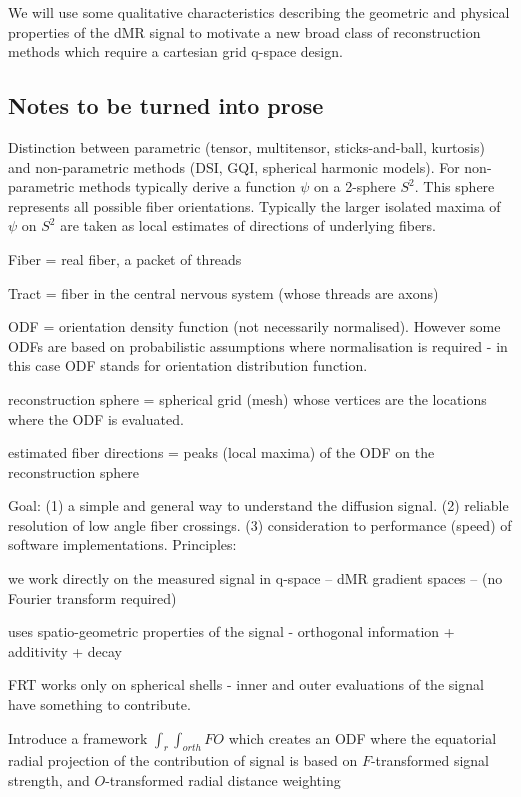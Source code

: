 \documentclass{bioinfo}
\begin{document}
We will use some qualitative characteristics describing the geometric
and physical properties of the dMR signal to motivate a new broad class
of reconstruction methods which require a cartesian grid q-space design.

\subsection{Notes to be turned into prose}

Distinction between parametric (tensor, multitensor, sticks-and-ball,
kurtosis) and non-parametric methods (DSI, GQI, spherical harmonic
models). For non-parametric methods typically derive a function $\psi$
on a 2-sphere $S^2$. This sphere represents all possible fiber
orientations. Typically the larger isolated maxima of $\psi$ on $S^2$
are taken as local estimates of directions of underlying fibers.

Fiber = real fiber, a packet of threads

Tract = fiber in the central nervous system (whose threads are axons)

ODF = orientation density function (not necessarily normalised). However
some ODFs are based on probabilistic assumptions where normalisation is
required - in this case ODF stands for orientation distribution function.

reconstruction sphere = spherical grid (mesh) whose vertices are the
locations where the ODF is evaluated.

estimated fiber directions = peaks (local maxima) of the ODF on the
reconstruction sphere

Goal: (1) a simple and general way to understand the diffusion
signal. (2) reliable resolution of low angle fiber crossings. (3)
consideration to performance (speed) of software implementations.
Principles:

we work directly on the measured signal in q-space -- dMR gradient
spaces -- (no Fourier transform required)

uses spatio-geometric properties of the signal - orthogonal information
+ additivity + decay

FRT works only on spherical shells - inner and outer evaluations of the
signal have something to contribute.

Introduce a framework $\int_r \int_{orth} F O$ which creates an ODF
where the equatorial radial projection of the contribution of signal is
based on $F$-transformed signal strength, and $O$-transformed radial
distance weighting
\end{document}
